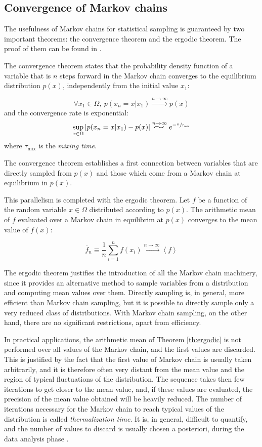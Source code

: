 \subsection*{Convergence of Markov chains}
The usefulness of Markov chains for statistical sampling is guaranteed by two important theorems:
the convergence theorem and the ergodic theorem. The proof of them can be found in \cite{mc-mt}.

The convergence theorem states that the probability density function of a variable that is $n$ steps forward in the Markov chain
converges to the equilibrium distribution $p(x)$, independently from the initial value $x_1$:
\begin{theorem}\label{th:convergence}
    \[
        \forall x_1 \in \Omega,\ p(x_{n}=x|x_1) \xrightarrow{n\to\infty} p(x)
    \]
    and the convergence rate is exponential:
    \[
        \sup_{x\in\Omega} |p(x_n=x|x_1) - p(x)| \stackrel{n\to\infty}{\scalebox{2}[1.25]{$\sim$}} e^{-\sfrac{n}{\tau_\mathrm{mix}}}
    \]
    where $\tau_\mathrm{mix}$ is the \emph{mixing time}.
\end{theorem}

The convergence theorem establishes a first connection between variables that are directly sampled from $p(x)$
and those which come from a Markov chain at equilibrium in $p(x)$.

This parallelism is completed with the ergodic theorem.
Let $f$ be a function of the random variable $x\in\Omega$ distributed according to $p(x)$.
The arithmetic mean of $f$ evaluated over a Markov chain in equilibrim at $p(x)$ converges to the mean value of $f(x)$:
\begin{theorem}\label{th:ergodic}
    \[
        \overline f_n \equiv \frac{1}{n}\sum_{i=1}^n f(x_i) \xrightarrow{n\to\infty} \left<f\right>
    \]
\end{theorem}

The ergodic theorem justifies the introduction of all the Markov chain machinery,
since it provides an alternative method to sample variables from a distribution and computing mean values over them.
Directly sampling is, in general, more efficient than Markov chain sampling,
but it is possible to directly sample only a very reduced class of distributions.
With Markov chain sampling, on the other hand, there are no significant restrictions, apart from efficiency.

In practical applications, the arithmetic mean of Theorem \ref{th:ergodic} is not performed over all values of the Markov chain,
and the first values are discarded.
This is justified by the fact that the first value of Markov chain is usually taken arbitrarily,
and it is therefore often very distant from the mean value and the region of typical fluctuations of the distribution.
The sequence takes then few iterations to get closer to the mean value, and, if these values are evaluated,
the precision of the mean value obtained will be heavily reduced.
The number of iterations necessary for the Markov chain to reach typical values of the distribution is called \emph{thermalization time}.
It is, in general, difficult to quantify, and the number of values to discard is usually chosen a posteriori, during the data analysis phase \cite{numerical_recipes}.


